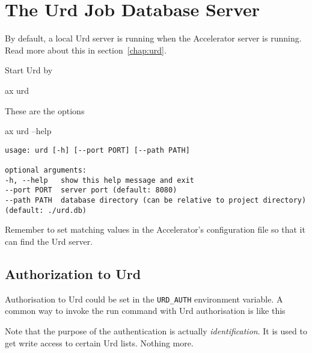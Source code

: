 \section{The Urd Job Database Server}
By default, a local Urd server is running when the Accelerator server
is running.  Read more about this in section~\ref{chap:urd}.

Start Urd by
\begin{shell}
ax urd
\end{shell}
These are the options
\begin{shell}
ax urd --help
\end{shell}
\begin{snugshade}
\begin{verbatim}
usage: urd [-h] [--port PORT] [--path PATH]

optional arguments:
-h, --help   show this help message and exit
--port PORT  server port (default: 8080)
--path PATH  database directory (can be relative to project directory)
(default: ./urd.db)
\end{verbatim}
\end{snugshade}
Remember to set matching values in the Accelerator's configuration
file so that it can find the Urd server.


\subsection{Authorization to Urd}
Authorisation to Urd could be set in the \texttt{URD\_AUTH}
environment variable.  A common way to invoke the run command with Urd
authorisation is like this
\begin{shell}
\end{shell}
Note that the purpose of the authentication is
actually \textsl{identification}.  It is used to get write access to
certain Urd lists.  Nothing more.
